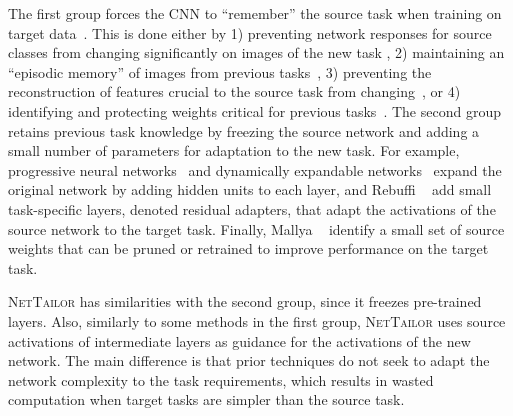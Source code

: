 \documentclass[10pt,twocolumn,letterpaper]{article}
\begin{document}
The first group forces the CNN to ``remember'' the source task when training on target data~\cite{li2017LwF, kirkpatrick2017EWC,aljundi2017expert}. This is done either by 1) preventing network responses for source classes from changing significantly on images of the new task \cite{li2017LwF,aljundi2017expert}, 2) maintaining an ``episodic memory'' of images from previous tasks~\cite{lopez2017gradient,rebuffi2017icarl}, 3) preventing the reconstruction of features crucial to the source task from changing~\cite{triki2017encoder}, or 4) identifying and protecting weights critical for previous tasks~\cite{kirkpatrick2017EWC, lee2017overcoming}.
The second group retains previous task knowledge by freezing the source network and adding a small number of parameters for adaptation to the new task. 
For example, progressive neural networks~\cite{rusu2016progressive} and dynamically expandable networks~\cite{yoon2017lifelong} expand the original network by adding hidden units to each layer, and Rebuffi \etal~\cite{rebuffi2017learning, rebuffi2018efficient} add small task-specific layers, denoted residual adapters, that adapt the activations of the source network to the target task. Finally, Mallya \etal~\cite{mallya2017packnet, mallya2018piggyback} identify a small set of source weights that can be pruned or retrained to improve performance on the target task.

\textsc{NetTailor} has similarities with the second group, since it freezes pre-trained layers. Also, similarly to some methods in the first group, \textsc{NetTailor} uses source activations of intermediate layers as guidance for the activations of the new network. 
The main difference is that prior techniques do not seek to adapt the network complexity to the task requirements, which results in wasted computation when target tasks are simpler than the source task.
\end{document}
